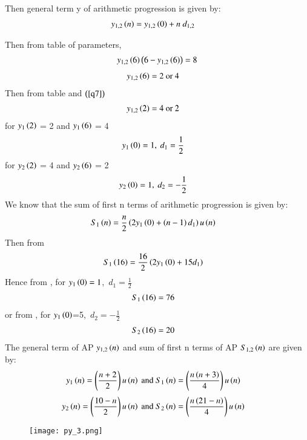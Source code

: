 \documentclass[beamer]{IEEEtran}
\theoremstyle{remark}
\begin{document}
Then general term y of arithmetic progression is given by:
\begin{align}
\label{q1}
y_{1,2}\brak{n}&=y_{1,2}\brak{0}+n\ d_{1,2}
\end{align}
 
Then from table of parameters,
\begin{align}
y_{1,2}\brak{6}\brak{6-y_{1,2}\brak{6}}=8
\end{align}
\begin{align}
\label{q7}
    y_{1,2}\brak{6}&=2\ \text{or}\ 4
\end{align}
Then from table and $\brak{\ref{q7}}$
\begin{align}
\label{q8}
    y_{1,2}\brak{2}&=4\ \text{or}\ 2
\end{align}
for $y_1\brak{2}$ = 2 and $y_1\brak{6}$ = 4
\begin{align}
y_1\brak{0}&=1,\ d_1=\frac{1}{2}
\end{align}
for $y_2\brak{2}$ = 4 and $y_2\brak{6}$ = 2
\begin{align}
y_2\brak{0}&=1,\ d_2=-\frac{1}{2}
\end{align}
We know that the sum of first n terms of arithmetic progression is given by:
\begin{align}
\label{q9}
S_1\brak{n}&= \frac{n}{2}\brak{2y_1\brak{0}+\brak{n-1}d_1}u\brak{n}
\end{align}
Then from \brak{\ref{q9}}
\begin{align}
\label{q10}
S_1\brak{16}&= \frac{16}{2}\brak{2y_1\brak{0}+15d_1}
\end{align}
Hence from \brak{\ref{q10}},
for $y_1\brak{0}=1$,\ $d_1=\frac{1}{2}$
\begin{align}
\label{11}
S_1\brak{16}&=76
\end{align}
or from \brak{\ref{q10}},
for $y_1\brak{0}$=5,\ $d_2=-\frac{1}{2}$
\begin{align}
\label{12}
S_2\brak{16}&=20
\end{align}
The general term of AP $y_{1,2}\brak{n}$ and sum of first n terms of AP $S_{1,2}\brak{n}$ are given by:
\begin{align}
y_1\brak{n}&=\brak{\frac{n+2}{2}}u\brak{n}\ \text{and}\ S_1\brak{n}=\brak{\frac{n\brak{n+3}}{4}}u\brak{n}
\end{align}
\begin{align}
y_2\brak{n}&=\brak{\frac{10-n}{2}}u\brak{n}\ \text{and}\ S_2\brak{n}=\brak{\frac{n\brak{21-n}}{4}}u\brak{n}
\end{align}

\begin{figure}[h]
    \centering
    \texttt{[image: py\_3.png]}
    \label{fig:x1n}
\end{figure}
\end{document}
